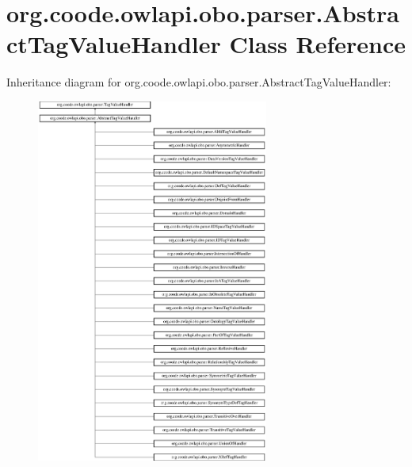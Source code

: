 \hypertarget{classorg_1_1coode_1_1owlapi_1_1obo_1_1parser_1_1_abstract_tag_value_handler}{\section{org.\-coode.\-owlapi.\-obo.\-parser.\-Abstract\-Tag\-Value\-Handler Class Reference}
\label{classorg_1_1coode_1_1owlapi_1_1obo_1_1parser_1_1_abstract_tag_value_handler}
}
Inheritance diagram for org.\-coode.\-owlapi.\-obo.\-parser.\-Abstract\-Tag\-Value\-Handler\-:\begin{figure}[H]
\begin{center}
\leavevmode
\includegraphics[height=12.000000cm]{classorg_1_1coode_1_1owlapi_1_1obo_1_1parser_1_1_abstract_tag_value_handler}
\end{center}
\end{figure}
